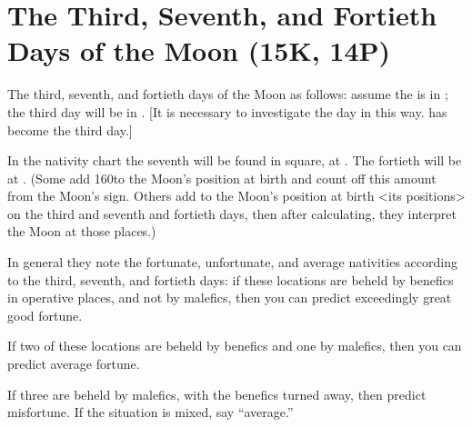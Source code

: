 \section{The Third, Seventh, and Fortieth Days of the Moon (15K, 14P)}
The third, seventh, and fortieth days of the Moon as follows: assume the \Moon\xspace is in \deg; the third day will be in \Sagittarius\xspace 7\deg. [It is necessary to investigate the day in this way. \Sagittarius\xspace 7\deg\xspace has
become the third day.] 

In the nativity chart the seventh will be found in square, at \Aquarius\xspace 7\deg. The fortieth will be at \Taurus\xspace 7\deg. (Some add 160\deg to the Moon’s position at birth and count off this amount from the Moon’s sign. Others add to the Moon’s position at birth <its positions> on the third and seventh
and fortieth days, then after calculating, they interpret the Moon at those places.)

\mndl[0.2cm]
In general they note the fortunate, unfortunate, and average nativities according to the third, seventh, and fortieth days: if these locations are beheld by benefics in operative places, and not by malefics, then you can predict exceedingly great good fortune. 

If two of these locations are beheld by benefics and one by malefics, then you can predict average fortune. 

If three are beheld by malefics, with the benefics turned
away, then predict misfortune. If the situation is mixed, say “average.”

\newpage